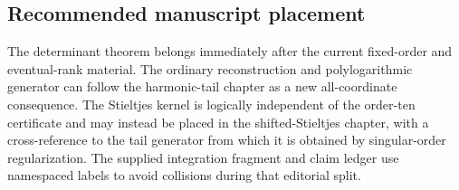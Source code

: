 \subsection{Recommended manuscript placement}

The determinant theorem belongs immediately after the current
fixed-order and eventual-rank material.  The ordinary reconstruction
and polylogarithmic generator can follow the harmonic-tail chapter as a
new all-coordinate consequence.  The Stieltjes kernel is logically
independent of the order-ten certificate and may instead be placed in
the shifted-Stieltjes chapter, with a cross-reference to the tail
generator from which it is obtained by singular-order regularization.
The supplied integration fragment and claim ledger use namespaced labels
to avoid collisions during that editorial split.
